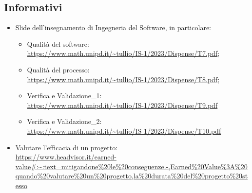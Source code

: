 \subsection{Informativi}
\begin{itemize}
    \item Slide dell’insegnamento di Ingegneria del Software, in particolare:
        \begin{itemize}
            \item Qualità del software: \\ \url{https://www.math.unipd.it/~tullio/IS-1/2023/Dispense/T7.pdf};
            \item Qualità del processo:\\ \url{https://www.math.unipd.it/~tullio/IS-1/2023/Dispense/T8.pdf};
            \item Verifica e Validazione\_1:\\ \url{https://www.math.unipd.it/~tullio/IS-1/2023/Dispense/T9.pdf}
            \item Verifica e Validazione\_2:\\ \url{https://www.math.unipd.it/~tullio/IS-1/2023/Dispense/T10.pdf}
        \end{itemize}
    \item Valutare l'efficacia di un progetto: \\ \url{https://www.headvisor.it/earned-value#:~:text=mitigandone%20le%20conseguenze.-,Earned%20Value%3A%20quando%20valutare%20un%20progetto,la%20durata%20del%20progetto%20stesso}
\end{itemize}
